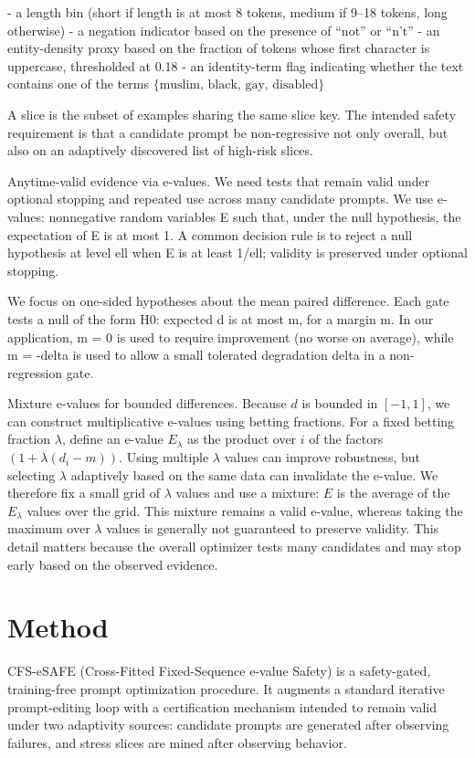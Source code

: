 \documentclass{article} %
\begin{document}
- a length bin (short if length is at most 8 tokens, medium if 9–18 tokens, long otherwise)
- a negation indicator based on the presence of “not” or “n’t”
- an entity-density proxy based on the fraction of tokens whose first character is uppercase, thresholded at 0.18
- an identity-term flag indicating whether the text contains one of the terms $\{\text{muslim, black, gay, disabled}\}$

A slice is the subset of examples sharing the same slice key. The intended safety requirement is that a candidate prompt be non-regressive not only overall, but also on an adaptively discovered list of high-risk slices.

Anytime-valid evidence via e-values. We need tests that remain valid under optional stopping and repeated use across many candidate prompts. We use e-values: nonnegative random variables E such that, under the null hypothesis, the expectation of E is at most 1. A common decision rule is to reject a null hypothesis at level ell when E is at least 1/ell; validity is preserved under optional stopping.

We focus on one-sided hypotheses about the mean paired difference. Each gate tests a null of the form H0: expected d is at most m, for a margin m. In our application, m = 0 is used to require improvement (no worse on average), while m = -delta is used to allow a small tolerated degradation delta in a non-regression gate.

Mixture e-values for bounded differences. Because $d$ is bounded in $[-1, 1]$, we can construct multiplicative e-values using betting fractions. For a fixed betting fraction $\lambda$, define an e-value $E_{\lambda}$ as the product over $i$ of the factors $(1 + \lambda (d_i - m))$. Using multiple $\lambda$ values can improve robustness, but selecting $\lambda$ adaptively based on the same data can invalidate the e-value. We therefore fix a small grid of $\lambda$ values and use a mixture: $E$ is the average of the $E_{\lambda}$ values over the grid. This mixture remains a valid e-value, whereas taking the maximum over $\lambda$ values is generally not guaranteed to preserve validity. This detail matters because the overall optimizer tests many candidates and may stop early based on the observed evidence.

\section{Method}\label{sec:method}
CFS-eSAFE (Cross-Fitted Fixed-Sequence e-value Safety) is a safety-gated, training-free prompt optimization procedure. It augments a standard iterative prompt-editing loop with a certification mechanism intended to remain valid under two adaptivity sources: candidate prompts are generated after observing failures, and stress slices are mined after observing behavior.
\end{document}
